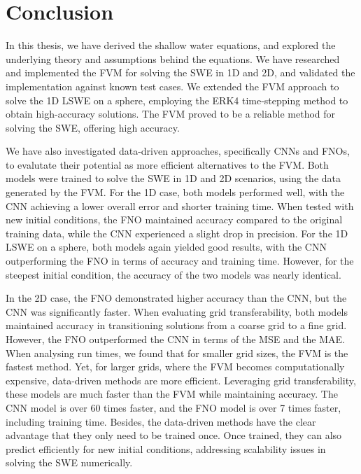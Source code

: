 \chapter{Conclusion}\label{ch:conclusion}
In this thesis, we have derived the shallow water equations, and explored the underlying theory and assumptions behind the equations.
We have researched and implemented the FVM for solving the SWE in 1D and 2D, and validated the implementation against known test cases.
We extended the FVM approach to solve the 1D LSWE on a sphere, employing the ERK4 time-stepping method to obtain high-accuracy solutions.
The FVM proved to be a reliable method for solving the SWE, offering high accuracy.

We have also investigated data-driven approaches, specifically CNNs and FNOs, to evalutate their potential as more efficient alternatives to the FVM.
Both models were trained to solve the SWE in 1D and 2D scenarios, using the data generated by the FVM.
For the 1D case, both models performed well, with the CNN achieving a lower overall error and shorter training time.
When tested with new initial conditions, the FNO maintained accuracy compared to the original training data, while the CNN experienced a slight drop in precision.
For the 1D LSWE on a sphere, both models again yielded good results, with the CNN outperforming the FNO in terms of accuracy and training time.
However, for the steepest initial condition, the accuracy of the two models was nearly identical.

In the 2D case, the FNO demonstrated higher accuracy than the CNN, but the CNN was significantly faster.
When evaluating grid transferability, both models maintained accuracy in transitioning solutions from a coarse grid to a fine grid.
However, the FNO outperformed the CNN in terms of the MSE and the MAE.
When analysing run times, we found that for smaller grid sizes, the FVM is the fastest method.
Yet, for larger grids, where the FVM becomes computationally expensive, data-driven methods are more efficient.
Leveraging grid transferability, these models are much faster than the FVM while maintaining accuracy.
The CNN model is over 60 times faster, and the FNO model is over 7 times faster, including training time.
Besides, the data-driven methods have the clear advantage that they only need to be trained once.
Once trained, they can also predict efficiently for new initial conditions, addressing scalability issues in solving the SWE numerically.

